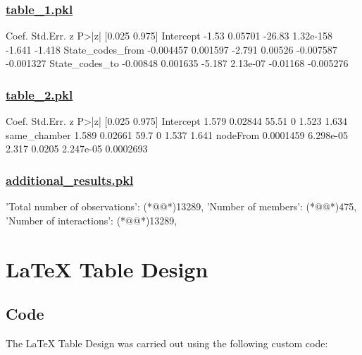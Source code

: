 \documentclass[11pt]{article}
\begin{document}
\subsubsection*{\hyperlink{code-Data Analysis-table-1-pkl}{table\_1.pkl}}

\begin{codeoutput}
                     Coef. Std.Err.      z      P>|z|    [0.025    0.975]
Intercept            -1.53  0.05701 -26.83  1.32e-158    -1.641    -1.418
State_codes_from -0.004457 0.001597 -2.791    0.00526 -0.007587 -0.001327
State_codes_to    -0.00848 0.001635 -5.187   2.13e-07  -0.01168 -0.005276
\end{codeoutput}\hypertarget{file-table-2-pkl}{}

\subsubsection*{\hyperlink{code-Data Analysis-table-2-pkl}{table\_2.pkl}}

\begin{codeoutput}
                 Coef.  Std.Err.     z   P>|z|    [0.025    0.975]
Intercept        1.579   0.02844 55.51       0     1.523     1.634
same_chamber     1.589   0.02661  59.7       0     1.537     1.641
nodeFrom     0.0001459 6.298e-05 2.317  0.0205 2.247e-05 0.0002693
\end{codeoutput}\hypertarget{file-additional-results-pkl}{}

\subsubsection*{\hyperlink{code-Data Analysis-additional-results-pkl}{additional\_results.pkl}}

\begin{codeoutput}
{
    'Total number of observations': (*@@*)13289,
    'Number of members': (*@@*)475,
    'Number of interactions': (*@@*)13289,
}
\end{codeoutput}

\section{LaTeX Table Design}
\subsection{{Code}}
The LaTeX Table Design was carried out using the following custom code:
\end{document}
